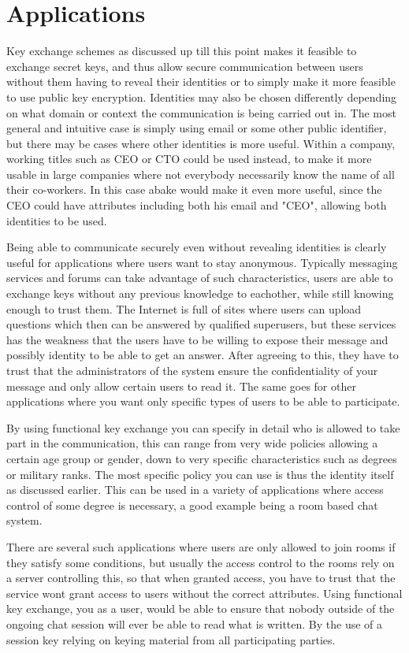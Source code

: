 \section{Applications}\label{sec:apps}
Key exchange schemes as discussed up till this point makes it feasible to exchange secret keys, and thus allow secure communication between users without them having to reveal their identities or to simply make it more feasible to use public key encryption. Identities may also be chosen differently depending on what domain or context the communication is being carried out in. The most general and intuitive case is simply using email or some other public identifier, but there may be cases where other identities is more useful. Within a company, working titles such as CEO or CTO could be used instead, to make it more usable in large companies where not everybody necessarily know the name of all their co-workers. In this case \gls{abake} would make it even more useful, since the CEO could have attributes including both his email and "CEO", allowing both identities to be used. 
\par Being able to communicate securely even without revealing identities is clearly useful for applications where users want to stay anonymous. Typically messaging services and forums can take advantage of such characteristics, users are able to exchange keys without any previous knowledge to eachother, while still knowing enough to trust them. The Internet is full of sites where users can upload questions which then can be answered by qualified superusers, but these services has the weakness that the users have to be willing to expose their message and possibly identity to be able to get an answer. After agreeing to this, they have to trust that the administrators of the system ensure the confidentiality of your message and only allow certain users to read it. The same goes for other applications where you want only specific types of users to be able to participate. 
\par By using functional key exchange you can specify in detail who is allowed to take part in the communication, this can range from very wide policies allowing a certain age group or gender, down to very specific characteristics such as degrees or military ranks. The most specific policy you can use is thus the identity itself as discussed earlier. This can be used in a variety of applications where access control of some degree is necessary, a good example being a room based chat system. 
\par There are several such applications where users are only allowed to join rooms if they satisfy some conditions, but usually the access control to the rooms rely on a server controlling this, so that when granted access, you have to trust that the service wont grant access to users without the correct attributes. Using functional key exchange, you as a user, would be able to ensure that nobody outside of the ongoing chat session will ever be able to read what is written. By the use of a session key relying on keying material from all participating parties.
